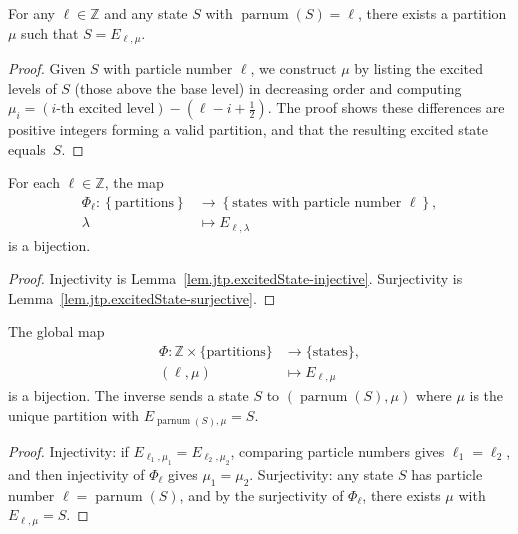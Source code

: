 \begin{lemma}
\label{lem.jtp.excitedState-surjective}
\leanhelper
\leanok
For any $\ell\in\mathbb{Z}$ and any state $S$ with $\operatorname{parnum}(S) = \ell$,
there exists a partition $\mu$ such that $S = E_{\ell,\mu}$.
\end{lemma}

\begin{proof}
\leanok
Given $S$ with particle number $\ell$, we construct $\mu$ by listing the excited
levels of $S$ (those above the base level) in decreasing order and computing
$\mu_i = (\text{$i$-th excited level}) - (\ell - i + \frac{1}{2})$.
The proof shows these differences are positive integers forming a valid partition,
and that the resulting excited state equals~$S$.
\end{proof}

\begin{theorem}
\label{thm.jtp.partitionToState-bijective}
\leanhelper
\leanok
For each $\ell\in\mathbb{Z}$, the map
\begin{align*}
\Phi_{\ell}:\left\{  \text{partitions}\right\}   &  \rightarrow\left\{
\text{states with particle number }\ell\right\}  ,\\
\lambda &  \mapsto E_{\ell,\lambda}
\end{align*}
is a bijection.
\end{theorem}

\begin{proof}
Injectivity is Lemma~\ref{lem.jtp.excitedState-injective}.
Surjectivity is Lemma~\ref{lem.jtp.excitedState-surjective}.
\end{proof}

\begin{theorem}
\label{thm.jtp.intPartitionToState-bijective}
\leanhelper
\leanok
The global map
\begin{align*}
\Phi : \mathbb{Z} \times \{\text{partitions}\} &\to \{\text{states}\}, \\
(\ell, \mu) &\mapsto E_{\ell,\mu}
\end{align*}
is a bijection. The inverse sends a state $S$ to $(\operatorname{parnum}(S), \mu)$
where $\mu$ is the unique partition with $E_{\operatorname{parnum}(S), \mu} = S$.
\end{theorem}

\begin{proof}
Injectivity: if $E_{\ell_1,\mu_1} = E_{\ell_2,\mu_2}$, comparing particle
numbers gives $\ell_1 = \ell_2$, and then injectivity of $\Phi_\ell$ gives
$\mu_1 = \mu_2$. Surjectivity: any state $S$ has particle number $\ell = \operatorname{parnum}(S)$,
and by the surjectivity of $\Phi_\ell$, there exists $\mu$ with $E_{\ell,\mu} = S$.
\end{proof}


